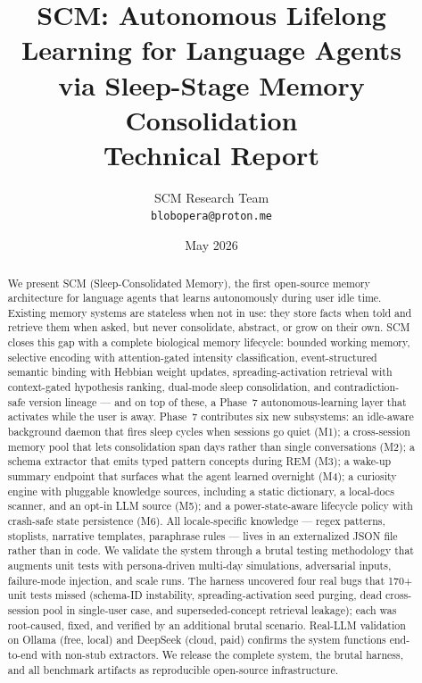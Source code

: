\documentclass[11pt,twocolumn]{article}
\title{\vspace{-1.4cm}SCM: Autonomous Lifelong Learning for Language Agents\\via Sleep-Stage Memory Consolidation\\\vspace{0.1cm}\large Technical Report\vspace{-0.3cm}}
\author{SCM Research Team\\\texttt{blobopera@proton.me}}
\date{May 2026}
\begin{document}
\maketitle

\begin{abstract}
We present SCM (Sleep-Consolidated Memory), the first open-source memory architecture for language agents that learns autonomously during user idle time. Existing memory systems are stateless when not in use: they store facts when told and retrieve them when asked, but never consolidate, abstract, or grow on their own. SCM closes this gap with a complete biological memory lifecycle: bounded working memory, selective encoding with attention-gated intensity classification, event-structured semantic binding with Hebbian weight updates, spreading-activation retrieval with context-gated hypothesis ranking, dual-mode sleep consolidation, and contradiction-safe version lineage --- and on top of these, a Phase~7 autonomous-learning layer that activates while the user is away. Phase~7 contributes six new subsystems: an idle-aware background daemon that fires sleep cycles when sessions go quiet (M1); a cross-session memory pool that lets consolidation span days rather than single conversations (M2); a schema extractor that emits typed pattern concepts during REM (M3); a wake-up summary endpoint that surfaces what the agent learned overnight (M4); a curiosity engine with pluggable knowledge sources, including a static dictionary, a local-docs scanner, and an opt-in LLM source (M5); and a power-state-aware lifecycle policy with crash-safe state persistence (M6). All locale-specific knowledge --- regex patterns, stoplists, narrative templates, paraphrase rules --- lives in an externalized JSON file rather than in code. We validate the system through a brutal testing methodology that augments unit tests with persona-driven multi-day simulations, adversarial inputs, failure-mode injection, and scale runs. The harness uncovered four real bugs that 170+ unit tests missed (schema-ID instability, spreading-activation seed purging, dead cross-session pool in single-user case, and superseded-concept retrieval leakage); each was root-caused, fixed, and verified by an additional brutal scenario. Real-LLM validation on Ollama (free, local) and DeepSeek (cloud, paid) confirms the system functions end-to-end with non-stub extractors. We release the complete system, the brutal harness, and all benchmark artifacts as reproducible open-source infrastructure.
\end{abstract}
\end{document}
